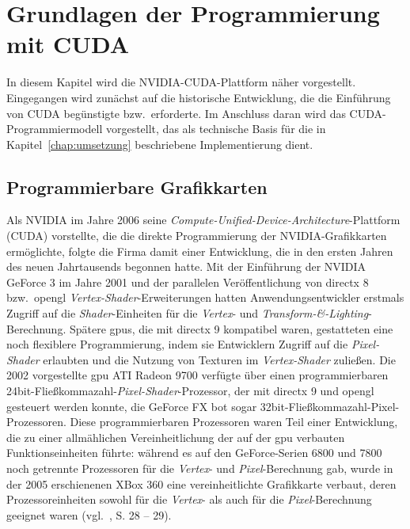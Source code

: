 \chapter{Grundlagen der Programmierung mit CUDA{\textregistered}}\label{chap:grundlagen_cuda}

In diesem Kapitel wird die NVIDIA{\textregistered}-CUDA{\textregistered}-Plattform näher vorgestellt. Eingegangen wird
zunächst auf die historische Entwicklung, die die Einführung von CUDA{\textregistered} begünstigte bzw.\ erforderte. Im
Anschluss daran wird das CUDA{\textregistered}-Programmiermodell vorgestellt, das als technische Basis für die in
Kapitel~\ref{chap:umsetzung} beschriebene Implementierung dient.

\section{Programmierbare Grafikkarten}\label{sec:cu_prog_gpu}

Als NVIDIA{\textregistered} im Jahre 2006 seine \textit{Compute-Unified-Device-Architecture}-Plattform
(CUDA{\textregistered}) vorstellte, die die direkte Programmierung der NVIDIA{\textregistered}-Grafikkarten ermöglichte,
folgte die Firma damit einer Entwicklung, die in den ersten Jahren des neuen Jahrtausends begonnen hatte. Mit der
Einführung der NVIDIA{\textregistered} GeForce 3 im Jahre 2001 und der parallelen Veröffentlichung von \gls{directx} 8
bzw.\ \gls{opengl} \textit{Vertex-Shader}-Erweiterungen hatten Anwendungsentwickler erstmals Zugriff auf die
\textit{Shader}-Einheiten für die \textit{Vertex}- und \textit{Transform-\&-Lighting}-Berechnung. Spätere \gls{gpu}s,
die mit \gls{directx} 9 kompatibel waren, gestatteten eine noch flexiblere Programmierung, indem sie Entwicklern Zugriff
auf die \textit{Pixel-Shader} erlaubten und die Nutzung von Texturen im \textit{Vertex-Shader} zuließen. Die 2002
vorgestellte \gls{gpu} ATI Radeon 9700 verfügte über einen programmierbaren
24bit-Fließkommazahl-\textit{Pixel-Shader}-Prozessor, der mit \gls{directx} 9 und \gls{opengl} gesteuert werden
konnte, die GeForce{\textregistered} FX bot sogar 32bit-Fließkommazahl-Pixel-Prozessoren. Diese programmierbaren
Prozessoren waren Teil einer Entwicklung, die zu einer allmählichen Vereinheitlichung der auf der \gls{gpu} verbauten
Funktionseinheiten führte: während es auf den GeForce{\textregistered}-Serien 6800 und 7800 noch getrennte Prozessoren
für die \textit{Vertex}- und \textit{Pixel}-Berechnung gab, wurde in der 2005 erschienenen XBox 360 eine 
{\glqq}vereinheitlichte{\grqq} Grafikkarte verbaut, deren Prozessoreinheiten sowohl für die \textit{Vertex}- als auch
für die \textit{Pixel}-Berechnung geeignet waren (vgl.~\cite{kirkhwu}, S. 28 -- 29).

